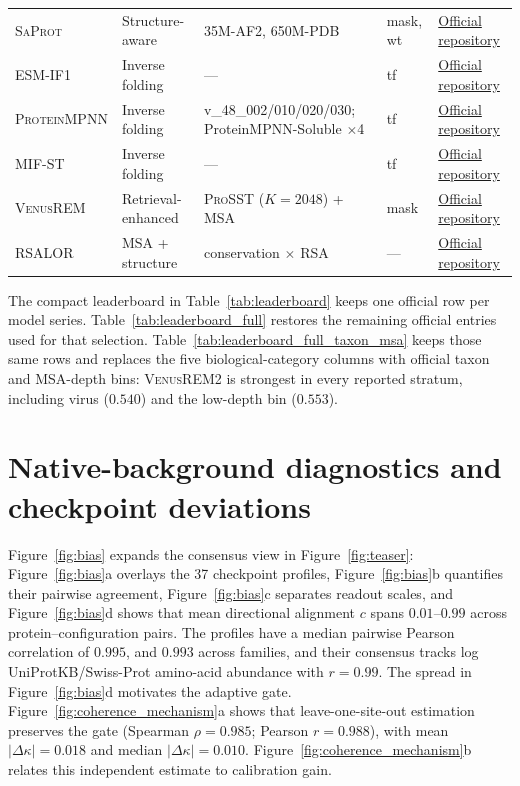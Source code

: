 \documentclass{article} %
\begin{document}
\begin{table}[!ht]
\begin{center}
{\begin{tabular}{lllll}
\textsc{SaProt} & Structure-aware & 35M-AF2, 650M-PDB & mask, wt & \href{https://github.com/westlake-repl/SaProt}{Official repository} \\
\textsc{ESM-IF1} & Inverse folding & --- & tf & \href{https://github.com/facebookresearch/esm}{Official repository} \\
\textsc{ProteinMPNN} & Inverse folding & v\_48\_002/010/020/030; ProteinMPNN-Soluble $\times$4 & tf & \href{https://github.com/dauparas/ProteinMPNN}{Official repository} \\
\textsc{MIF-ST} & Inverse folding & --- & tf & \href{https://github.com/microsoft/protein-sequence-models}{Official repository} \\
\textsc{VenusREM} & Retrieval-enhanced & \textsc{ProSST} ($K{=}2048$) + MSA & mask & \href{https://github.com/ai4protein/VenusREM}{Official repository} \\
\textsc{RSALOR} & MSA + structure & conservation $\times$ RSA & --- & \href{https://github.com/3BioCompBio/RSALOR}{Official repository} \\
\bottomrule
\end{tabular}}%
\end{center}
\end{table}

The compact leaderboard in Table~\ref{tab:leaderboard} keeps one official row per model series. Table~\ref{tab:leaderboard_full} restores the remaining official entries used for that selection. Table~\ref{tab:leaderboard_full_taxon_msa} keeps those same rows and replaces the five biological-category columns with official taxon and MSA-depth bins: \textsc{VenusREM2} is strongest in every reported stratum, including virus ($0.540$) and the low-depth bin ($0.553$).





\FloatBarrier
\section{Native-background diagnostics and checkpoint deviations}
\label{app:bias_details}

Figure~\ref{fig:bias} expands the consensus view in Figure~\ref{fig:teaser}: Figure~\ref{fig:bias}a overlays the 37 checkpoint profiles, Figure~\ref{fig:bias}b quantifies their pairwise agreement, Figure~\ref{fig:bias}c separates readout scales, and Figure~\ref{fig:bias}d shows that mean directional alignment $c$ spans $0.01$--$0.99$ across protein--configuration pairs. The profiles have a median pairwise Pearson correlation of $0.995$, and $0.993$ across families, and their consensus tracks log UniProtKB/Swiss-Prot amino-acid abundance with $r=0.99$. The spread in Figure~\ref{fig:bias}d motivates the adaptive gate. Figure~\ref{fig:coherence_mechanism}a shows that leave-one-site-out estimation preserves the gate (Spearman $\rho=0.985$; Pearson $r=0.988$), with mean $|\Delta\kappa|=0.018$ and median $|\Delta\kappa|=0.010$. Figure~\ref{fig:coherence_mechanism}b relates this independent estimate to calibration gain.
\end{document}
